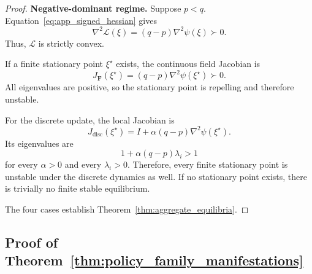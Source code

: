 \documentclass[sigconf,anonymous,review]{acmart}
\theoremstyle{acmdefinition}
\begin{document}
\begin{proof}
\medskip
\noindent\textbf{Negative-dominant regime.}
Suppose \(p<q\). Equation~\eqref{eq:app_signed_hessian} gives
\begin{equation}
    \nabla^2\mathcal L(\xi)
    =
    (q-p)
    \nabla^2\psi(\xi)
    \succ0.
\end{equation}
Thus, \(\mathcal L\) is strictly convex.

If a finite stationary point \(\xi^\star\) exists, the continuous field
Jacobian is
\begin{equation}
    J_{\mathbf F}(\xi^\star)
    =
    (q-p)
    \nabla^2\psi(\xi^\star)
    \succ0.
    \label{eq:app_negative_continuous_jacobian}
\end{equation}
All eigenvalues are positive, so the stationary point is repelling and
therefore unstable.

For the discrete update, the local Jacobian is
\begin{equation}
    J_{\mathrm{disc}}(\xi^\star)
    =
    I
    +
    \alpha(q-p)
    \nabla^2\psi(\xi^\star).
    \label{eq:app_negative_discrete_jacobian}
\end{equation}
Its eigenvalues are
\[
    1+\alpha(q-p)\lambda_i
    >
    1
\]
for every \(\alpha>0\) and every \(\lambda_i>0\). Therefore, every finite
stationary point is unstable under the discrete dynamics as well. If no
stationary point exists, there is trivially no finite stable equilibrium.

The four cases establish
Theorem~\ref{thm:aggregate_equilibria}.
\end{proof}


\subsection{Proof of
Theorem~\ref{thm:policy_family_manifestations}}
\label{app:policy_family_manifestations}
\end{document}
